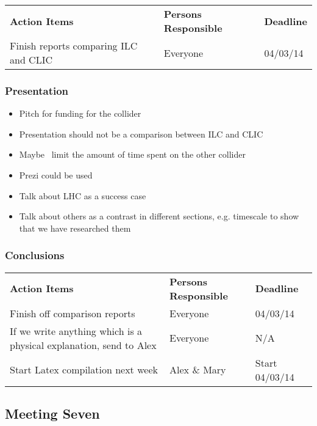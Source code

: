 \begin{tabularx}{\textwidth}{X p{4.5cm} p{1.2cm}}
  \textbf{Action Items} & \textbf{Persons Responsible} & \textbf{Deadline} \\

Finish reports comparing ILC and CLIC
& Everyone &
04/03/14 \\

\end{tabularx}

\subsubsection{Presentation}

\begin{itemize}
\item Pitch for funding for the collider
\item Presentation should not be a comparison between ILC and CLIC
\item Maybe  \textemdash \, limit the amount of time spent on the other collider
\item Prezi could be used
\item Talk about LHC as a success case
\item Talk about others as a contrast in different sections, e.g. timescale to show that we have researched them

\end{itemize}

\subsubsection{Conclusions}

\begin{tabularx}{\textwidth}{X p{4.5cm} p{1.2cm}}
  \textbf{Action Items} & \textbf{Persons Responsible} & \textbf{Deadline} \\

Finish off comparison reports
& Everyone &
04/03/14 \\
 
 If we write anything which is a physical explanation, send to Alex
& Everyone &
N/A \\
 
 Start Latex compilation next week
& Alex \& Mary &
Start 04/03/14 \\

\end{tabularx}


\subsection{Meeting Seven}

